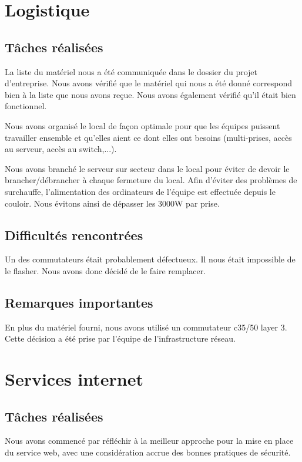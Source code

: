 \documentclass{article}
\begin{document}
\section{Logistique}
    \subsection{Tâches réalisées} 
        La liste du matériel nous a été communiquée dans le dossier du projet d'entreprise. Nous avons vérifié que le matériel qui nous a été donné correspond bien à la liste que nous avons reçue. Nous avons également vérifié qu'il était bien fonctionnel.
        
        Nous avons organisé le local de façon optimale pour que les équipes puissent travailler ensemble et qu'elles aient ce dont elles ont besoins (multi-prises, accès au serveur, accès au switch,...).
        
        Nous avons branché le serveur sur secteur dans le local pour éviter de devoir le brancher/débrancher à chaque fermeture du local. Afin d'éviter des problèmes de surchauffe, l'alimentation des ordinateurs de l'équipe est effectuée depuis le couloir. Nous évitons ainsi de dépasser les 3000W par prise.
       
    \subsection{Difficultés rencontrées}
    
        Un des commutateurs était probablement défectueux. Il nous était impossible de le flasher. Nous avons donc décidé de le faire remplacer.
    \subsection{Remarques importantes}
    
        En plus du matériel fourni, nous avons utilisé un commutateur c35/50 layer 3. Cette décision a été prise par l'équipe de l'infrastructure réseau.

\section{Services internet}
    \subsection{Tâches réalisées} 
    Nous avons commencé par réfléchir à la meilleur approche pour la mise en place du service web, avec une considération accrue des bonnes pratiques de sécurité.
\end{document}
